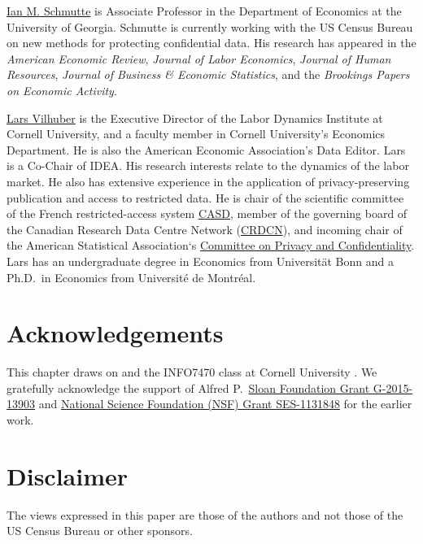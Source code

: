 \href{http://ianschmutte.org/}{Ian M. Schmutte} is Associate Professor in the Department of Economics at the University of Georgia. Schmutte is currently working with the US Census Bureau on new methods for protecting confidential data. His research has appeared in the \emph{American Economic Review}, \emph{Journal of Labor Economics}, \emph{Journal of Human Resources}, \emph{Journal of Business \& Economic Statistics}, and the \emph{Brookings Papers on Economic Activity}.

\href{https://lars.vilhuber.com/}{Lars Vilhuber} is the Executive Director of the Labor Dynamics Institute at Cornell University, and a faculty member in Cornell University's Economics Department. He is also the American Economic Association's Data Editor. Lars is a Co-Chair of IDEA. His research interests relate to the dynamics of the labor market. He also has extensive experience in the application of privacy-preserving publication and access to restricted data. He is chair of the scientific committee of the French restricted-access system \href{https://casd.eu}{CASD}, member of the governing board of the Canadian Research Data Centre Network (\href{https://crdcn.org}{CRDCN}), and incoming chair of the American Statistical Association`s \href{https://community.amstat.org/cpc/home}{Committee on Privacy and Confidentiality}. Lars has an undergraduate degree in Economics from Universität Bonn and a Ph.D.~in Economics from Université de Montréal.

\hypertarget{acknowledgements}{%
\section*{Acknowledgements}\label{acknowledgements}}

This chapter draws on \citet{abowd_introductory_2019} and the INFO7470 class at Cornell University \citep{abowd_session_2016}. We gratefully acknowledge the support of Alfred P.~\href{https://sloan.org/grant-detail/6845}{Sloan Foundation Grant G-2015-13903} and \href{http://www.nsf.gov/awardsearch/showAward.do?AwardNumber=1131848}{National Science Foundation (NSF) Grant SES-1131848} for the earlier work.

\hypertarget{disclaimer}{%
\section*{Disclaimer}\label{disclaimer}}

The views expressed in this paper are those of the authors and not those of the US Census Bureau or other sponsors.

\putbib

